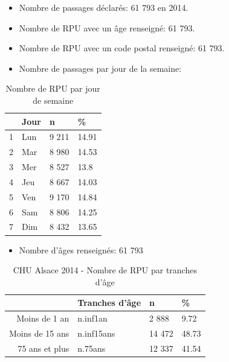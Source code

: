 \documentclass[]{article}
\begin{document}
\begin{itemize}
\itemsep1pt\parskip0pt
\item
  Nombre de passages déclarés: 61 793 en 2014.
\item
  Nombre de RPU avec un âge renseigné: 61 793.
\item
  Nombre de RPU avec un code postal renseigné: 61 793.
\item
  Nombre de passages par jour de la semaine:
\end{itemize}

\begin{table}[ht]
\centering
\begin{tabular}{rlll}
  \hline
 & Jour & n & \% \\ 
  \hline
1 & Lun & 9 211 & 14.91 \\ 
  2 & Mar & 8 980 & 14.53 \\ 
  3 & Mer & 8 527 & 13.8 \\ 
  4 & Jeu & 8 667 & 14.03 \\ 
  5 & Ven & 9 170 & 14.84 \\ 
  6 & Sam & 8 806 & 14.25 \\ 
  7 & Dim & 8 432 & 13.65 \\ 
   \hline
\end{tabular}
\caption{Nombre de RPU par jour de semaine} 
\end{table}

\begin{itemize}
\itemsep1pt\parskip0pt
\item
  Nombre d'âges renseignés: 61 793
\end{itemize}

\begin{table}[ht]
\centering
\begin{tabular}{rlll}
  \hline
 & Tranches d'âge & n & \% \\ 
  \hline
Moins de 1 an & n.inf1an &  2 888 & 9.72 \\ 
  Moins de 15 ans & n.inf15ans & 14 472 & 48.73 \\ 
  75 ans et plus & n.75ans & 12 337 & 41.54 \\ 
   \hline
\end{tabular}
\caption{CHU Alsace 2014 - Nombre de RPU par tranches d'âge} 
\end{table}
\end{document}
